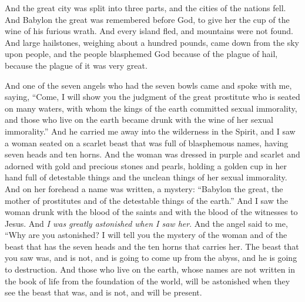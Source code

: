 \begin{biblechapter}
\verse And the great city was split into three parts, and the cities of the nations fell. And Babylon the great was remembered before God, to give her the cup of the wine of his furious wrath.
\verse And every island fled, and mountains were not found.
\verse And large hailstones, weighing about a hundred pounds, came down from the sky upon people, and the people blasphemed God because of the plague of hail, because the plague of it was very great.
\end{biblechapter}

\begin{biblechapter} %
 And one of the seven angels who had the seven bowls came and spoke with me, saying, “Come, I will show you the judgment of the great prostitute who is seated on many waters,
\verse with whom the kings of the earth committed sexual immorality, and those who live on the earth became drunk with the wine of her sexual immorality.”
\verse And he carried me away into the wilderness in the Spirit, and I saw a woman seated on a scarlet beast that was full of blasphemous names, having seven heads and ten horns.
\verse And the woman was dressed in purple and scarlet and adorned with gold and precious stones and pearls, holding a golden cup in her hand full of detestable things and the unclean things of her sexual immorality.
\verse And on her forehead a name was written, a mystery: “Babylon the great, the mother of prostitutes and of the detestable things of the earth.”
\verse And I saw the woman drunk with the blood of the saints and with the blood of the witnesses to Jesus.
\verse And \textit{I was greatly astonished when I saw her}.
\verse And the angel said to me, “Why are you astonished? I will tell you the mystery of the woman and of the beast that has the seven heads and the ten horns that carries her.
\verse The beast that you saw was, and is not, and is going to come up from the abyss, and he is going to destruction. And those who live on the earth, whose names are not written in the book of life from the foundation of the world, will be astonished when they see the beast that was, and is not, and will be present.

\end{biblechapter}
